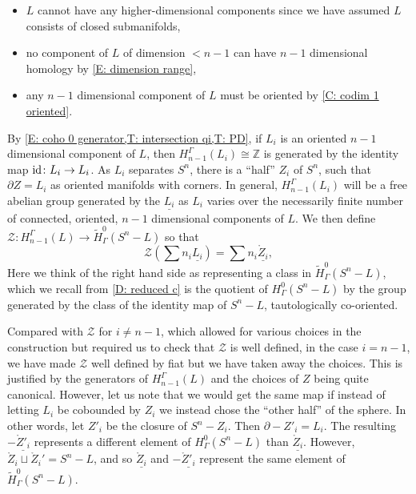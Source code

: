 \documentclass[12pt]{article}
\theoremstyle{plain}
\theoremstyle{definition}
\theoremstyle{remark}
\newcommand{\td}[1]{\tilde{#1}}
\newcommand{\mr}[1]{\mathring{#1}}
\newcommand{\Z}{\mathbb{Z}}
\newcommand{\bd}{\partial}
\newcommand{\mc}[1]{\mathcal{#1}}
\newcommand{\id}{\textup{id}}
\begin{document}
\begin{itemize}
\item $L$ cannot have any higher-dimensional components since we have assumed $L$ consists of closed submanifolds,

\item no component of $L$ of dimension $<n-1$ can have $n-1$ dimensional homology by \cref{E: dimension range},

\item any $n-1$ dimensional component of $L$ must be oriented by \cref{C: codim 1 oriented}.
\end{itemize}

By \cref{E: coho 0 generator,T: intersection qi,T: PD}, if $L_i$ is an oriented $n-1$ dimensional component of $L$, then $H_{n-1}^\Gamma(L_i) \cong \Z$ is generated by the identity map $\id \colon L_i \to L_i$.
As $L_i$ separates $S^n$, there is a ``half'' $Z_i$ of $S^n$, such that $\bd Z = L_i$ as oriented manifolds with corners.
In general, $H_{n-1}^\Gamma(L_i)$ will be a free abelian group generated by the $\underline{L_i}$ as $L_i$ varies over the necessarily finite number of connected, oriented, $n-1$ dimensional components of $L$.
We then define $\mc Z \colon H_{n-1}^\Gamma(L) \to \td H^{0}_\Gamma(S^n-L)$ so that $$\mc Z(\sum n_i \underline{L_i}) = \sum n_i \underline{\mr Z_i},$$
Here we think of the right hand side as representing a class in $\td H^{0}_\Gamma(S^n-L)$, which we recall from \cref{D: reduced c} is the quotient of $H^{0}_\Gamma(S^n-L)$ by the group generated by the class of the identity map of $S^n-L$, tautologically co-oriented.

Compared with $\mc Z$ for $i \neq n-1$, which allowed for various choices in the construction but required us to check that $\mc Z$ is well defined, in the case $i = n-1$, we have made $\mc Z$ well defined by fiat but we have taken away the choices.
This is justified by the generators of $H_{n-1}^\Gamma(L)$ and the choices of $Z$ being quite canonical.
However, let us note that we would get the same map if instead of letting $L_i$ be cobounded by $Z_i$ we instead chose the ``other half'' of the sphere.
In other words, let $Z'_i$ be the closure of $S^n-Z_i$.
Then $\bd -Z'_i = L_i$.
The resulting $-\underline{\mr Z'_i}$ represents a different element of $H^{0}_\Gamma(S^n-L)$ than $\underline {\mr Z_i}$.
However, $\mr Z_i \sqcup \mr Z_i' = S^n-L$, and so $\underline {\mr Z_i}$ and  $-\underline{\mr Z'_i}$ represent the same element of $\td H^0_\Gamma(S^n - L)$.
\end{document}
